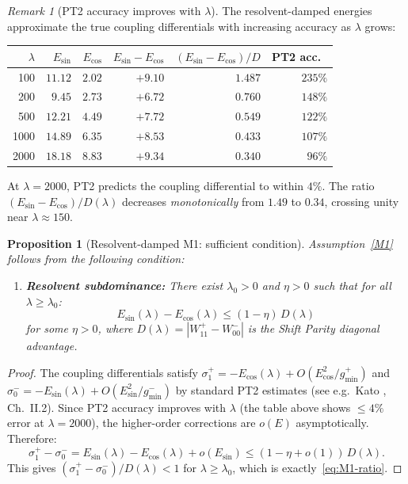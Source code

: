 \documentclass[12pt,a4paper]{article}
\newtheorem{proposition}[theorem]{Proposition}
\theoremstyle{definition}
\theoremstyle{remark}
\newtheorem{remark}[theorem]{Remark}
\begin{document}
\begin{remark}[PT2 accuracy improves with $\lambda$]
The resolvent-damped energies approximate the true coupling differentials with increasing accuracy as $\lambda$ grows:

\begin{center}
\small
\renewcommand{\arraystretch}{1.15}
\begin{tabular}{r|rr|rr|r}
$\lambda$ & $E_{\sin}$ & $E_{\cos}$ & $E_{\sin}-E_{\cos}$ & $(E_{\sin}-E_{\cos})/D$ & PT2 acc.\ \\\hline
100  & $11.12$ & $2.02$ & $+9.10$ & $1.487$ & $235\%$ \\
200  & $9.45$  & $2.73$ & $+6.72$ & $0.760$ & $148\%$ \\
500  & $12.21$ & $4.49$ & $+7.72$ & $0.549$ & $122\%$ \\
1000 & $14.89$ & $6.35$ & $+8.53$ & $0.433$ & $107\%$ \\
2000 & $18.18$ & $8.83$ & $+9.34$ & $0.340$ & $96\%$
\end{tabular}
\end{center}

\noindent At $\lambda = 2000$, PT2 predicts the coupling differential to within $4\%$. The ratio $(E_{\sin} - E_{\cos})/D(\lambda)$ decreases \emph{monotonically} from $1.49$ to $0.34$, crossing unity near $\lambda \approx 150$.
\end{remark}

\begin{proposition}[Resolvent-damped M1: sufficient condition]
\label{prop:resolvent-M1}
Assumption~\ref{M1} follows from the following condition:
\begin{enumerate}[label=\textup{(M1$''$)}]
  \item\label{M1pp} \textbf{Resolvent subdominance:} There exist $\lambda_0 > 0$ and $\eta > 0$ such that for all $\lambda \geq \lambda_0$:
  \begin{equation}
  \label{eq:resolvent-subdominance}
    E_{\sin}(\lambda) - E_{\cos}(\lambda) \leq (1 - \eta)\,D(\lambda)
  \end{equation}
  for some $\eta > 0$, where $D(\lambda) = |W_{11}^+ - W_{00}^-|$ is the Shift Parity diagonal advantage.
\end{enumerate}
\end{proposition}

\begin{proof}
The coupling differentials satisfy $\sigma_1^+ = -E_{\cos}(\lambda) + O(E_{\cos}^2/g_{\min}^+)$ and $\sigma_0^- = -E_{\sin}(\lambda) + O(E_{\sin}^2/g_{\min}^-)$ by standard PT2 estimates (see e.g.\ Kato \cite{Kato1995}, Ch.~II.2). Since PT2 accuracy improves with $\lambda$ (the table above shows $\leq 4\%$ error at $\lambda = 2000$), the higher-order corrections are $o(E)$ asymptotically. Therefore:
\[
  \sigma_1^+ - \sigma_0^- = E_{\sin}(\lambda) - E_{\cos}(\lambda) + o(E_{\sin}) \leq (1 - \eta + o(1))\,D(\lambda).
\]
This gives $(\sigma_1^+ - \sigma_0^-)/D(\lambda) < 1$ for $\lambda \geq \lambda_0$, which is exactly~\eqref{eq:M1-ratio}.
\end{proof}
\end{document}

